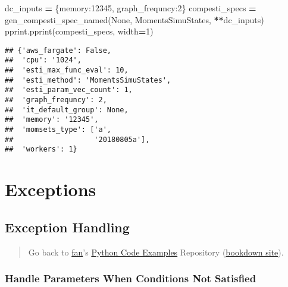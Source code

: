 \documentclass[
]{book}
\newenvironment{Shaded}{\begin{snugshade}}{\end{snugshade}}
\newcommand{\DecValTok}[1]{\textcolor[rgb]{0.00,0.00,0.81}{#1}}
\newcommand{\NormalTok}[1]{#1}
\newcommand{\OperatorTok}[1]{\textcolor[rgb]{0.81,0.36,0.00}{\textbf{#1}}}
\newcommand{\StringTok}[1]{\textcolor[rgb]{0.31,0.60,0.02}{#1}}
\newcommand{\VariableTok}[1]{\textcolor[rgb]{0.00,0.00,0.00}{#1}}
\begin{document}
\begin{Shaded}
\begin{Highlighting}[]
\NormalTok{dc\_inputs }\OperatorTok{=}\NormalTok{ \{}\StringTok{\textquotesingle{}memory\textquotesingle{}}\NormalTok{:}\DecValTok{12345}\NormalTok{, }\StringTok{\textquotesingle{}graph\_frequncy\textquotesingle{}}\NormalTok{:}\DecValTok{2}\NormalTok{\}}
\NormalTok{compesti\_specs }\OperatorTok{=}\NormalTok{ gen\_compesti\_spec\_named(}\VariableTok{None}\NormalTok{, }\StringTok{\textquotesingle{}MomentsSimuStates\textquotesingle{}}\NormalTok{, }\OperatorTok{**}\NormalTok{dc\_inputs)}
\NormalTok{pprint.pprint(compesti\_specs, width}\OperatorTok{=}\DecValTok{1}\NormalTok{)}
\end{Highlighting}
\end{Shaded}

\begin{verbatim}
## {'aws_fargate': False,
##  'cpu': '1024',
##  'esti_max_func_eval': 10,
##  'esti_method': 'MomentsSimuStates',
##  'esti_param_vec_count': 1,
##  'graph_frequncy': 2,
##  'it_default_group': None,
##  'memory': '12345',
##  'momsets_type': ['a',
##                   '20180805a'],
##  'workers': 1}
\end{verbatim}

\hypertarget{exceptions}{%
\section{Exceptions}\label{exceptions}}

\hypertarget{exception-handling}{%
\subsection{Exception Handling}\label{exception-handling}}

\begin{quote}
Go back to \href{http://fanwangecon.github.io/}{fan}'s \href{https://fanwangecon.github.io/pyfan/}{Python Code Examples} Repository (\href{https://fanwangecon.github.io/pyfan/bookdown}{bookdown site}).
\end{quote}

\hypertarget{handle-parameters-when-conditions-not-satisfied}{%
\subsubsection{Handle Parameters When Conditions Not Satisfied}\label{handle-parameters-when-conditions-not-satisfied}}
\end{document}
